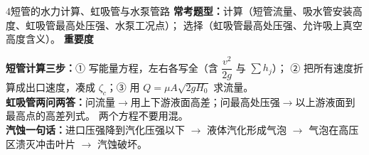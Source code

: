 \begin{kaodian}{4}{短管的水力计算、虹吸管与水泵管路}
\textbf{常考题型：}计算（短管流量、吸水管安装高度、虹吸管最高处压强、水泵工况点）；
选择（虹吸管最高处压强、允许吸上真空高度含义）。
\textbf{重要度 }\quad{}\quad{}

\begin{banfa}
\textbf{短管计算三步：}① 写能量方程，左右各写全（含 $\dfrac{v^2}{2g}$ 与 $\sum h_j$）；
② 把所有速度折算成出口速度，凑成 $\zeta_c$；③ 用 $Q=\mu A\sqrt{2gH_0}$ 求流量。\\
\textbf{虹吸管两问两答：}问流量$\to$用上下游液面高差；问最高处压强$\to$以上游液面到最高点的高差列式。
两个方程不要用混。\\
\textbf{汽蚀一句话：}进口压强降到汽化压强以下 $\to$ 液体汽化形成气泡 $\to$ 气泡在高压区溃灭冲击叶片 $\to$ 汽蚀破坏。
\end{banfa}
\end{kaodian}

